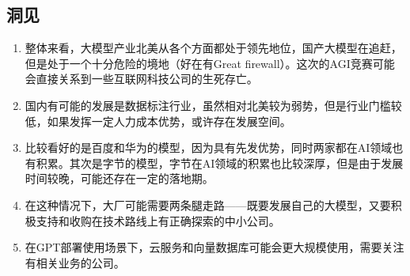\subsection{洞见}
\begin{enumerate}
    \item 整体来看，大模型产业北美从各个方面都处于领先地位，国产大模型在追赶，但是处于一个十分危险的境地（好在有Great firewall）。这次的AGI竞赛可能会直接关系到一些互联网科技公司的生死存亡。
    \item 国内有可能的发展是数据标注行业，虽然相对北美较为弱势，但是行业门槛较低，如果发挥一定人力成本优势，或许存在发展空间。
    \item 比较看好的是百度和华为的模型，因为具有先发优势，同时两家都在AI领域也有积累。其次是字节的模型，字节在AI领域的积累也比较深厚，但是由于发展时间较晚，可能还存在一定的落地期。
    \item 在这种情况下，大厂可能需要两条腿走路——既要发展自己的大模型，又要积极支持和收购在技术路线上有正确探索的中小公司。
    \item 在GPT部署使用场景下，云服务和向量数据库可能会更大规模使用，需要关注有相关业务的公司。
\end{enumerate}

